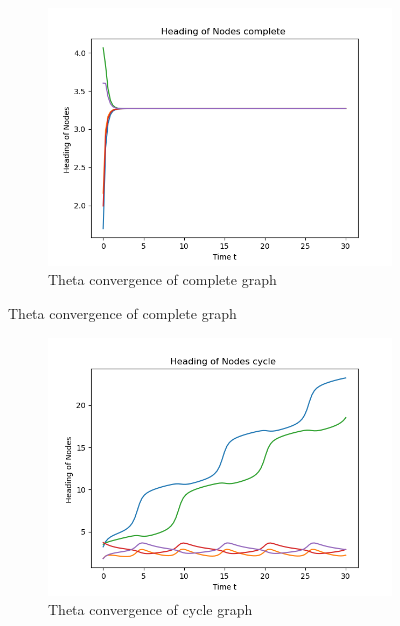 \documentclass{article}
\begin{document}
\begin{problem}
\begin{figure}[!h]
\begin{subfigure}{0.35\textwidth}
            \includegraphics[width=\textwidth]{./img/p3_complete1.png}
            \caption{Theta convergence of complete graph }
        \end{subfigure}
    \end{figure}
    \begin{figure}[!h]
        \centering
        \begin{subfigure}{0.35\textwidth}
            \includegraphics[width=\textwidth]{./img/p3_cycle2.png}
            \caption{Theta convergence of cycle graph }
        \end{subfigure}
        \begin{subfigure}{0.35\textwidth}

\end{subfigure}
\end{figure}
\end{problem}
\end{document}
